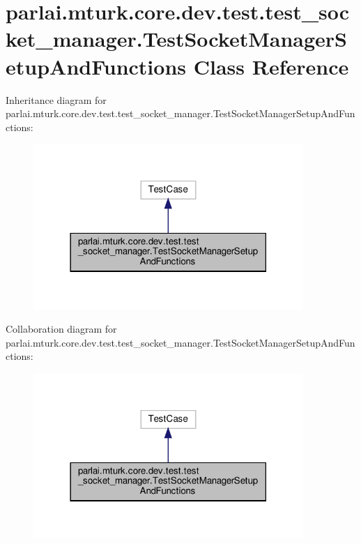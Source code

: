 \hypertarget{classparlai_1_1mturk_1_1core_1_1dev_1_1test_1_1test__socket__manager_1_1TestSocketManagerSetupAndFunctions}{}\section{parlai.\+mturk.\+core.\+dev.\+test.\+test\+\_\+socket\+\_\+manager.\+Test\+Socket\+Manager\+Setup\+And\+Functions Class Reference}
\label{classparlai_1_1mturk_1_1core_1_1dev_1_1test_1_1test__socket__manager_1_1TestSocketManagerSetupAndFunctions}


Inheritance diagram for parlai.\+mturk.\+core.\+dev.\+test.\+test\+\_\+socket\+\_\+manager.\+Test\+Socket\+Manager\+Setup\+And\+Functions\+:
\nopagebreak
\begin{figure}[H]
\begin{center}
\leavevmode
\includegraphics[width=290pt]{d1/d51/classparlai_1_1mturk_1_1core_1_1dev_1_1test_1_1test__socket__manager_1_1TestSocketManagerSetupAndFunctions__inherit__graph}
\end{center}
\end{figure}


Collaboration diagram for parlai.\+mturk.\+core.\+dev.\+test.\+test\+\_\+socket\+\_\+manager.\+Test\+Socket\+Manager\+Setup\+And\+Functions\+:
\nopagebreak
\begin{figure}[H]
\begin{center}
\leavevmode
\includegraphics[width=290pt]{de/d54/classparlai_1_1mturk_1_1core_1_1dev_1_1test_1_1test__socket__manager_1_1TestSocketManagerSetupAndFunctions__coll__graph}
\end{center}
\end{figure}
